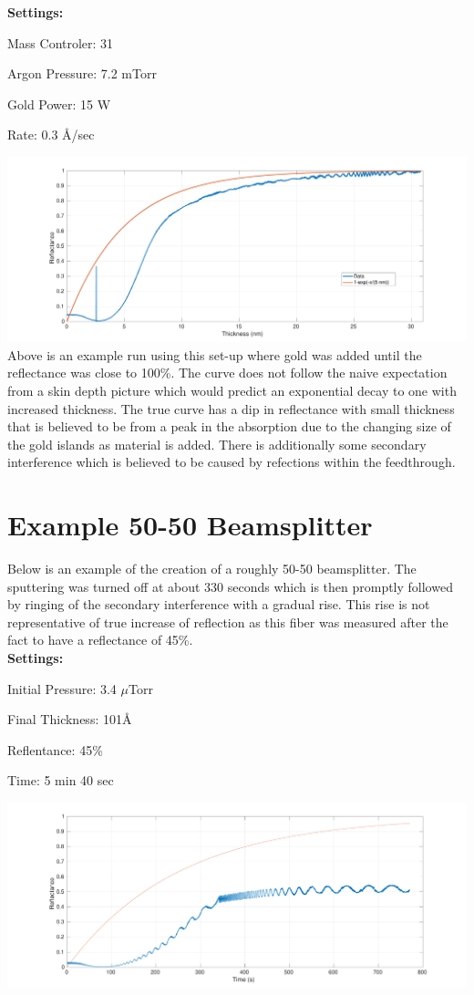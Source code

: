 \documentclass{article}
\begin{document}
\textbf{Settings:}

Mass Controler: 31

Argon Pressure: 7.2 mTorr

Gold Power: 15 W

Rate: 0.3 \AA/sec

\includegraphics[width=\textwidth]{Gold_Coating_Fiber.pdf}
Above is an example run using this set-up where gold was added until the reflectance was close to 100\%. The curve does not follow the naive expectation from a skin depth picture which would predict an exponential decay to one with increased thickness. The true curve has a dip in reflectance with small thickness that is believed to be from a peak in the absorption due to the changing size of the gold islands as material is added. There is additionally some secondary interference which is believed to be caused by refections within the feedthrough.

\section{Example 50-50 Beamsplitter}
Below is an example of the creation of a roughly 50-50 beamsplitter. The sputtering was turned off at about 330 seconds which is then promptly followed by ringing of the secondary interference with a gradual rise. This rise is not representative of true increase of reflection as this fiber was measured after the fact to have a reflectance of 45\%.\\

\textbf{Settings:}

Initial Pressure: 3.4 $\mu$Torr

Final Thickness: 101\AA

Reflentance: 45\%

Time:  5 min 40 sec

\includegraphics[width=\textwidth]{BS_Coating_Fiber_Time.pdf}
\end{document}
